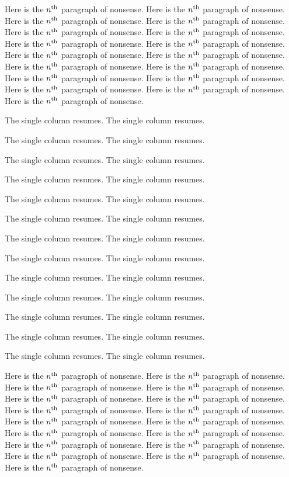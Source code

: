Here is the $n^{\rm th}$ paragraph of nonsense.
Here is the $n^{\rm th}$ paragraph of nonsense.
Here is the $n^{\rm th}$ paragraph of nonsense.
Here is the $n^{\rm th}$ paragraph of nonsense.
Here is the $n^{\rm th}$ paragraph of nonsense.
Here is the $n^{\rm th}$ paragraph of nonsense.
Here is the $n^{\rm th}$ paragraph of nonsense.
Here is the $n^{\rm th}$ paragraph of nonsense.
Here is the $n^{\rm th}$ paragraph of nonsense.
Here is the $n^{\rm th}$ paragraph of nonsense.
Here is the $n^{\rm th}$ paragraph of nonsense.
Here is the $n^{\rm th}$ paragraph of nonsense.
Here is the $n^{\rm th}$ paragraph of nonsense.
Here is the $n^{\rm th}$ paragraph of nonsense.
Here is the $n^{\rm th}$ paragraph of nonsense.
Here is the $n^{\rm th}$ paragraph of nonsense.
Here is the $n^{\rm th}$ paragraph of nonsense.

\singlecolumn

The single column resumes. The single column resumes. 

The single column resumes. The single column resumes. 

The single column resumes. The single column resumes. 

The single column resumes. The single column resumes. 

The single column resumes. The single column resumes. 

The single column resumes. The single column resumes. 

The single column resumes. The single column resumes. 

The single column resumes. The single column resumes. 

The single column resumes. The single column resumes. 

The single column resumes. The single column resumes. 

The single column resumes. The single column resumes. 

The single column resumes. The single column resumes. 

The single column resumes. The single column resumes. 


Here is the $n^{\rm th}$ paragraph of nonsense.
Here is the $n^{\rm th}$ paragraph of nonsense.
Here is the $n^{\rm th}$ paragraph of nonsense.
Here is the $n^{\rm th}$ paragraph of nonsense.
Here is the $n^{\rm th}$ paragraph of nonsense.
Here is the $n^{\rm th}$ paragraph of nonsense.
Here is the $n^{\rm th}$ paragraph of nonsense.
Here is the $n^{\rm th}$ paragraph of nonsense.
Here is the $n^{\rm th}$ paragraph of nonsense.
Here is the $n^{\rm th}$ paragraph of nonsense.
Here is the $n^{\rm th}$ paragraph of nonsense.
Here is the $n^{\rm th}$ paragraph of nonsense.
Here is the $n^{\rm th}$ paragraph of nonsense.
Here is the $n^{\rm th}$ paragraph of nonsense.
Here is the $n^{\rm th}$ paragraph of nonsense.
Here is the $n^{\rm th}$ paragraph of nonsense.
Here is the $n^{\rm th}$ paragraph of nonsense.

